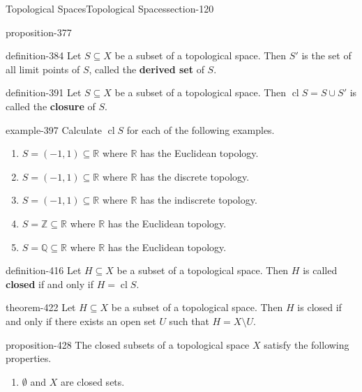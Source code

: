 \documentclass[oneside,10pt,]{article}
\newcommand{\terminology}[1]{\textbf{#1}}
\newcommand{\mb}{\mathbb}
\newcommand{\cl}{\operatorname{cl}}
\begin{document}
\begin{sectionptx}{Topological Spaces}{}{Topological Spaces}{}{}{section-120}
\begin{proposition}{}{}{proposition-377}
\end{proposition}
\begin{definition}{}{definition-384}%
\hypertarget{p-385}{}%
Let \(S\subseteq X\) be a subset of a topological space. Then \(S'\) is the set of all limit points of \(S\), called the \terminology{derived set} of \(S\).%
\end{definition}
\begin{definition}{}{definition-391}%
\hypertarget{p-392}{}%
Let \(S\subseteq X\) be a subset of a topological space. Then \(\cl S=S\cup S'\) is called the \terminology{closure} of \(S\).%
\end{definition}
\begin{example}{}{example-397}%
\hypertarget{p-398}{}%
Calculate \(\cl S\) for each of the following examples.%
\leavevmode%
\begin{enumerate}
\item\hypertarget{li-401}{}\(S=(-1,1)\subseteq\mb R\) where \(\mb R\) has the Euclidean topology.%
\item\hypertarget{li-404}{}\(S=(-1,1)\subseteq\mb R\) where \(\mb R\) has the discrete topology.%
\item\hypertarget{li-407}{}\(S=(-1,1)\subseteq\mb R\) where \(\mb R\) has the indiscrete topology.%
\item\hypertarget{li-410}{}\(S=\mb Z\subseteq\mb R\) where \(\mb R\) has the Euclidean topology.%
\item\hypertarget{li-413}{}\(S=\mb Q\subseteq\mb R\) where \(\mb R\) has the Euclidean topology.%
\end{enumerate}
\end{example}
\begin{definition}{}{definition-416}%
\hypertarget{p-417}{}%
Let \(H\subseteq X\) be a subset of a topological space. Then \(H\) is called \terminology{closed} if and only if \(H=\cl S\).%
\end{definition}
\begin{theorem}{}{}{theorem-422}%
\hypertarget{p-423}{}%
Let \(H\subseteq X\) be a subset of a topological space. Then \(H\) is closed if and only if there exists an open set \(U\) such that \(H=X\setminus U\).%
\end{theorem}
\begin{proposition}{}{}{proposition-428}%
\hypertarget{p-429}{}%
The closed subsets of a topological space \(X\) satisfy the following properties.%
\leavevmode%
\begin{enumerate}
\item\hypertarget{li-432}{}\(\emptyset\) and \(X\) are closed sets.%

\end{enumerate}
\end{proposition}
\end{sectionptx}
\end{document}
